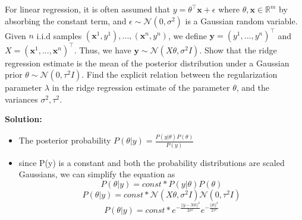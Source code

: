 \documentclass[twoside,10pt]{article}
\begin{document}
For linear regression, it is often assumed that $y = \theta^\top \textbf{x} + \epsilon$ where $\theta, \textbf{x} \in \mathbb{R}^m$ by absorbing the constant term, and $\epsilon \sim \mathcal{N} (0, \sigma^2)$ is a Gaussian random variable. Given $n$ i.i.d samples $(\textbf{x}^1, y^1), ..., (\textbf{x}^n, y^n)$, we define $\textbf{y} = (y^1, ..., y^n)^\top$ and $X = (\textbf{x}^1, ..., \textbf{x}^n)^\top$. Thus, we have $\textbf{y} \sim \mathcal{N} (X\theta, \sigma^2 I)$. Show that the ridge regression estimate is the mean of the posterior distribution under a Gaussian prior $\theta \sim \mathcal{N} (0, \tau^2 I)$. Find the explicit relation between the regularization parameter $\lambda$ in the ridge regression estimate of the parameter $\theta$, and the variances $\sigma^2, \tau^2$.

\textbf{ Solution: }
\begin{itemize}
\item The posterior probability $P(\theta|y) = \frac{P(y|\theta)P(\theta)}{P(y)}$
\item since P(y) is a constant and both the probability distributions are scaled Gaussians, we can simplify the equation as 
$$P(\theta|y) = const * P(y|\theta)P(\theta)$$
$$P(\theta|y)  = const * \mathcal{N} (X\theta, \sigma^2 I) \mathcal{N} (0, \tau^2 I)$$
$$P(\theta|y)  = const * e^{ -\frac{||y-X\theta||^2}{2\sigma^2}} e^{ -\frac{||\theta||^2}{2\tau^2}}$$


\end{itemize}
\end{document}
